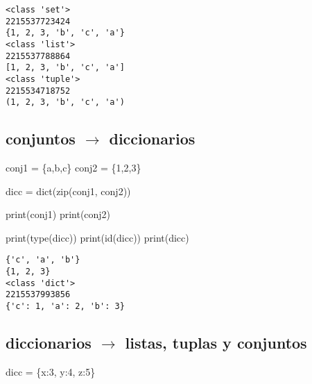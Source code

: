 \documentclass[
  letterpaper,
  DIV=11,
  numbers=noendperiod]{scrreprt}
\newenvironment{Shaded}{\begin{snugshade}}{\end{snugshade}}
\newcommand{\BuiltInTok}[1]{\textcolor[rgb]{0.00,0.23,0.31}{#1}}
\newcommand{\DecValTok}[1]{\textcolor[rgb]{0.68,0.00,0.00}{#1}}
\newcommand{\NormalTok}[1]{\textcolor[rgb]{0.00,0.23,0.31}{#1}}
\newcommand{\OperatorTok}[1]{\textcolor[rgb]{0.37,0.37,0.37}{#1}}
\newcommand{\StringTok}[1]{\textcolor[rgb]{0.13,0.47,0.30}{#1}}
\begin{document}
\begin{verbatim}
<class 'set'>
2215537723424
{1, 2, 3, 'b', 'c', 'a'}
<class 'list'>
2215537788864
[1, 2, 3, 'b', 'c', 'a']
<class 'tuple'>
2215534718752
(1, 2, 3, 'b', 'c', 'a')
\end{verbatim}

\subsection{\texorpdfstring{conjuntos \(\to\)
diccionarios}{conjuntos \textbackslash to diccionarios}}\label{conjuntos-to-diccionarios}

\begin{Shaded}
\begin{Highlighting}[]
\NormalTok{conj1 }\OperatorTok{=}\NormalTok{ \{}\StringTok{\textquotesingle{}a\textquotesingle{}}\NormalTok{,}\StringTok{\textquotesingle{}b\textquotesingle{}}\NormalTok{,}\StringTok{\textquotesingle{}c\textquotesingle{}}\NormalTok{\}}
\NormalTok{conj2 }\OperatorTok{=}\NormalTok{ \{}\DecValTok{1}\NormalTok{,}\DecValTok{2}\NormalTok{,}\DecValTok{3}\NormalTok{\}}

\NormalTok{dicc }\OperatorTok{=} \BuiltInTok{dict}\NormalTok{(}\BuiltInTok{zip}\NormalTok{(conj1, conj2))}

\BuiltInTok{print}\NormalTok{(conj1)}
\BuiltInTok{print}\NormalTok{(conj2)}

\BuiltInTok{print}\NormalTok{(}\BuiltInTok{type}\NormalTok{(dicc))}
\BuiltInTok{print}\NormalTok{(}\BuiltInTok{id}\NormalTok{(dicc))}
\BuiltInTok{print}\NormalTok{(dicc)}
\end{Highlighting}
\end{Shaded}

\begin{verbatim}
{'c', 'a', 'b'}
{1, 2, 3}
<class 'dict'>
2215537993856
{'c': 1, 'a': 2, 'b': 3}
\end{verbatim}

\subsection{\texorpdfstring{diccionarios \(\to\) listas, tuplas y
conjuntos}{diccionarios \textbackslash to listas, tuplas y conjuntos}}\label{diccionarios-to-listas-tuplas-y-conjuntos}

\begin{Shaded}
\begin{Highlighting}[]
\NormalTok{dicc }\OperatorTok{=}\NormalTok{ \{}\StringTok{\textquotesingle{}x\textquotesingle{}}\NormalTok{:}\DecValTok{3}\NormalTok{, }\StringTok{\textquotesingle{}y\textquotesingle{}}\NormalTok{:}\DecValTok{4}\NormalTok{, }\StringTok{\textquotesingle{}z\textquotesingle{}}\NormalTok{:}\DecValTok{5}\NormalTok{\}}
\end{Highlighting}
\end{Shaded}
\end{document}
